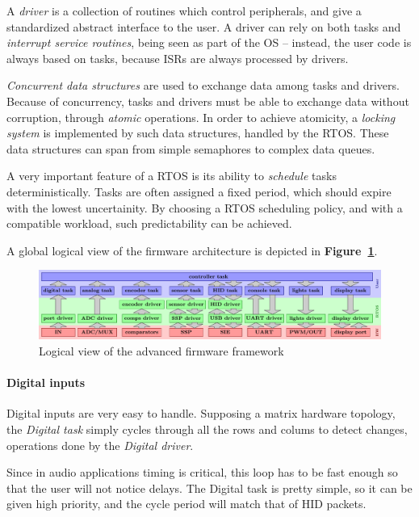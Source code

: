 \documentclass[a4paper,10pt]{article}
\newcommand{\citef}[1]{\textbf{Figure~\ref{#1}}}
\begin{document}
\begin{multicols}{2}
A \emph{driver} is a collection of routines which control peripherals, and
give a standardized abstract interface to the user. A driver can rely on both
tasks and \emph{interrupt service routines}, being seen as part of the OS
-- instead, the user code is always based on tasks, because ISRs are
always processed by drivers.

\emph{Concurrent data structures} are used to exchange data among tasks and
drivers. Because of concurrency, tasks and drivers must be able to exchange
data without corruption, through \emph{atomic} operations. In order to achieve
atomicity, a \emph{locking system} is implemented by such data structures,
handled by the RTOS. These data structures can span from simple semaphores
to complex data queues.

A very important feature of a RTOS is its ability to \emph{schedule} tasks
deterministically. Tasks are often assigned a fixed period, which should
expire with the lowest uncertainity. By choosing a RTOS scheduling policy,
and with a compatible workload, such predictability can be achieved.

A global logical view of the firmware architecture is depicted in
\citef{fig:fw_adv}.

\begin{figure}[t]
	\centering
	\includegraphics[keepaspectratio=true,scale=0.4]{images/fw_adv.pdf}
	\caption{Logical view of the advanced firmware framework}
	\label{fig:fw_adv}
\end{figure}


\paragraph{Digital inputs}
Digital inputs are very easy to handle. Supposing a matrix hardware topology,
the \emph{Digital task} simply cycles through all the rows and colums to
detect changes, operations done by the \emph{Digital driver}.

Since in audio applications timing is critical, this loop has to be fast
enough so that the user will not notice delays. The Digital task is pretty
simple, so it can be given high priority, and the cycle period will match
that of HID packets.


\end{multicols}
\end{document}
